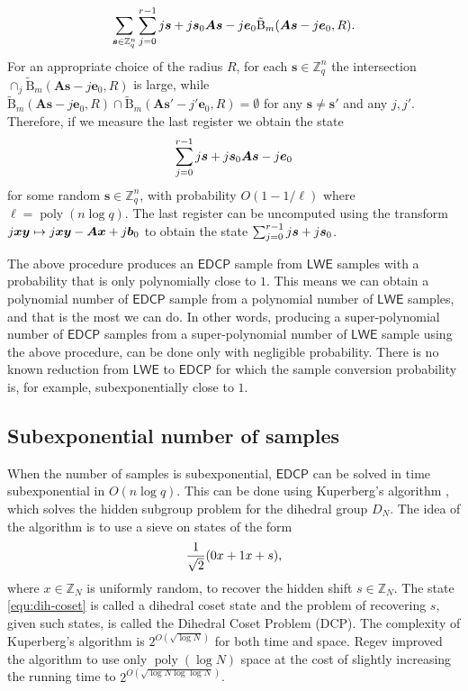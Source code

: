 \documentclass[11pt]{article}
\theoremstyle{plain}
\theoremstyle{definition}
\DeclareMathOperator{\poly}{poly}
\let\ket\relax
\DeclarePairedDelimiter{\ket}{\lvert}{\rangle}
\def\Z{\mathbb{Z}}
\def\lwe{\mathsf{LWE}}
\def\edcp{\mathsf{EDCP}}
\begin{document}
\[ \sum_{\bm{s} \in \Z_q^n} \sum_{j = 0}^{r - 1} \ket{j}\ket{\bm{s} + j\bm{s}_0}\ket{\bm{As} - j\bm{e}_0}\ket{\tilde{\mathrm{B}}_m(\bm{As} - j\bm{e}_0, R)}. \]
For an appropriate choice of the radius $R$, for each $\bm{s} \in \Z_q^n$ the intersection $\cap_{j} \tilde{\mathrm{B}}_m(\bm{As} - j\bm{e}_0, R)$ is large, while $\tilde{\mathrm{B}}_m(\bm{As} - j\bm{e}_0, R) \cap \tilde{\mathrm{B}}_m(\bm{As}' - j'\bm{e}_0, R) = \emptyset$ for any $\bm{s} \ne \bm{s}'$ and any $j, j'$. Therefore, if we measure the last register we obtain the state
\[ \sum_{j = 0}^{r - 1} \ket{j}\ket{\bm{s} + j\bm{s}_0}\ket{\bm{As} - j\bm{e}_0} \]
for some random $\bm{s} \in \Z_q^n$, with probability $O(1 - 1 / \ell)$ where $\ell = \poly(n\log q)$. The last register can be uncomputed using the transform $\ket{j}\ket{\bm{x}}\ket{\bm{y}} \mapsto \ket{j}\ket{\bm{x}}\ket{\bm{y} - \bm{Ax} + j\bm{b}_0}$ to obtain the state $\sum_{j = 0}^{r - 1} \ket{j}\ket{\bm{s} + j\bm{s}_0}$.

The above procedure produces an $\edcp$ sample from $\lwe$ samples with a probability that is only polynomially close to $1$. This means we can obtain a polynomial number of $\edcp$ sample from a polynomial number of $\lwe$ samples, and that is the most we can do. In other words, producing a super-polynomial number of $\edcp$ samples from a super-polynomial number of $\lwe$ sample using the above procedure, can be done only with negligible probability. There is no known reduction from $\lwe$ to $\edcp$ for which the sample conversion probability is, for example, subexponentially close to $1$.


\subsection{Subexponential number of samples}
\label{sec:hardness-subexp}

When the number of samples is subexponential, $\edcp$ can be solved in time subexponential in $O(n\log q)$. This can be done using Kuperberg's algorithm \cite{kuperberg2005subexponential, kuperberg2011another}, which solves the hidden subgroup problem for the dihedral group $D_N$. The idea of the algorithm is to use a sieve on states of the form
\begin{equation}
    \label{equ:dih-coset}
    \frac{1}{\sqrt{2}}(\ket{0}\ket{x} + \ket{1}\ket{x + s}),
\end{equation}
where $x \in \Z_N$ is uniformly random, to recover the hidden shift $s \in \Z_N$. The state \eqref{equ:dih-coset} is called a dihedral coset state and the problem of recovering $s$, given such states, is called the Dihedral Coset Problem (DCP). The complexity of Kuperberg's algorithm is $2^{O(\sqrt{\log N})}$ for both time and space. Regev \cite{regev2004subexponential} improved the algorithm to use only $\poly(\log N)$ space at the cost of slightly increasing the running time to $2^{O(\sqrt{\log N \log\log N})}$.
\end{document}

